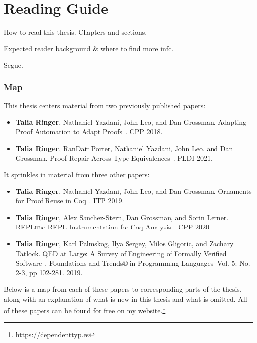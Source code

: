 \section{Reading Guide}


How to read this thesis.
Chapters and sections.

Expected reader background \& where to find more info.

Segue.

\subsubsection*{Map}

This thesis centers material from two previously published papers:

\begin{itemize}
\item \textbf{Talia Ringer}, Nathaniel Yazdani, John Leo, and Dan Grossman. Adapting Proof Automation to Adapt Proofs~\cite{ringer2018adapting}. CPP 2018.
\item \textbf{Talia Ringer}, RanDair Porter, Nathaniel Yazdani, John Leo, and Dan Grossman. Proof Repair Across Type Equivalences~\cite{Ringer2021}. PLDI 2021.
\end{itemize}
It sprinkles in material from three other papers:

\begin{itemize}
\item \textbf{Talia Ringer}, Nathaniel Yazdani, John Leo, and Dan Grossman. Ornaments for Proof Reuse in Coq~\cite{Ringer2019}. ITP 2019.
\item \textbf{Talia Ringer}, Alex Sanchez-Stern, Dan Grossman, and Sorin Lerner. \textsc{REPLica}: REPL Instrumentation for Coq Analysis~\cite{replica}. CPP 2020.
\item \textbf{Talia Ringer}, Karl Palmskog, Ilya Sergey, Milos Gligoric, and Zachary Tatlock. QED at Large: A Survey of Engineering of Formally Verified Software~\cite{PGL-045}. Foundations and Trends® in Programming Languages: Vol. 5: No. 2-3, pp 102-281. 2019. 
\end{itemize}
Below is a map from each of these papers to corresponding parts of the thesis,
along with an explanation of what is new in this thesis and what is omitted.
All of these papers can be found for free on my website.\footnote{\url{https://dependenttyp.es}}

